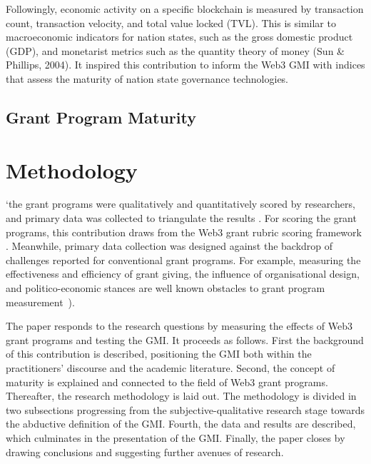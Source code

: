 \documentclass[conference]{IEEEtran}
\begin{document}
Followingly, economic activity on a specific blockchain is measured by transaction count, transaction velocity, and total value locked (TVL). This is similar to macroeconomic indicators for nation states, such as the gross domestic product (GDP), and monetarist metrics such as the quantity theory of money (Sun \& Phillips, 2004). It inspired this contribution to inform the Web3 GMI with indices that assess the maturity of nation state governance technologies.

\subsection{Grant Program Maturity}

\section{Methodology}\label{sec_3}


`the grant programs were qualitatively and quantitatively scored by researchers, and primary data was collected to triangulate the results \cite{creswell_designing_2017,datta_paradigm_2006}. For scoring the grant programs, this contribution draws from the Web3 grant rubric scoring framework \cite{biedermann_evaluating_2024}. Meanwhile, primary data collection was designed against the backdrop of challenges reported for conventional grant programs. For example, measuring the effectiveness and efficiency of grant giving, the influence of organisational design, and politico-economic stances are well known obstacles to grant program measurement~\cite{lerner_government_2000}).



The paper responds to the research questions by measuring the effects of Web3 grant programs and testing the GMI. It proceeds as follows. First the background of this contribution is described, positioning the GMI both within the practitioners’ discourse and the academic literature. Second, the concept of maturity is explained and connected to the field of Web3 grant programs. Thereafter, the research methodology is laid out. The methodology is divided in two subsections progressing from the subjective-qualitative research stage towards the abductive definition of the GMI. Fourth, the data and results are described, which culminates in the presentation of the GMI. Finally, the paper closes by drawing conclusions and suggesting further avenues of research.
\end{document}
